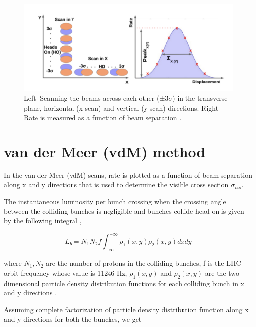 \begin{figure}[h]
    \centering
    \includegraphics[width=1\textwidth]{ashish_thesis/vdm_method.png}
    \caption[vdM Scan Schematic]{Left: Scanning the beams across each other (±3$\sigma$) in the transverse plane, horizontal (x-scan) and vertical (y-scan) directions. Right: Rate is measured as a function of beam separation \cite{karacheban2017luminosity}.}
    \label{fig:vdm_scan_method}
\end{figure}

\section{van der Meer (vdM) method}

In the van der Meer (vdM) scans,  rate is plotted as a function of beam separation along x and y directions that is used to determine the visible cross section $\sigma_{vis}$.

The instantaneous luminosity  per bunch crossing when the crossing angle between the colliding bunches is negligible and bunches collide head on is given by the following integral \cite{CMS-PAS-LUM-13-001}, 

\begin{equation}
L_{b} = N_1 N_2 f \int^{+\infty}_{-\infty} \rho_1(x,y) \rho_2(x, y) dx dy 
\end{equation}

where $N_1, N_2$ are the number of protons in the colliding bunches, f is the LHC orbit frequency whose value is 11246 Hz,  $\rho_1(x,y)$ and $\rho_2(x,y)$ are the two dimensional particle density distribution functions for each colliding bunch in x and y directions  \cite{CMS-PAS-LUM-17-004}. 

Assuming complete factorization of particle density distribution function along x and y directions for both the bunches, we get 

